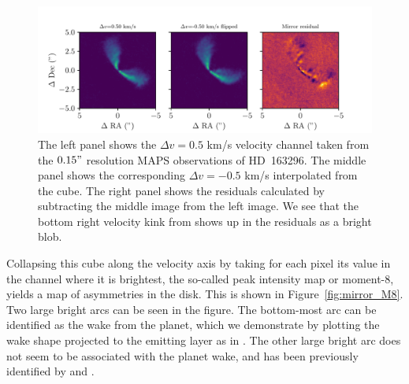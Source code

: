 \begin{figure}
    \centering
    \includegraphics[width = 0.999\textwidth]{figures/channel060jvm.pdf}
    \caption{The left panel shows the $\Delta v = 0.5$ km/s velocity channel taken from the $0.15"$ resolution MAPS observations of HD~163296. The middle panel shows the corresponding $\Delta v = -0.5$ km/s interpolated from the cube. The right panel shows the residuals calculated by subtracting the middle image from the left image. We see that the bottom right velocity kink from \citet{calcino2022} shows up in the residuals as a bright blob.}
    \label{fig:mirror_residuals}
\end{figure}

Collapsing this cube along the velocity axis by taking for each pixel its value in the channel where it is brightest, the so-called peak intensity map or moment-8, yields a map of asymmetries in the disk.
This is shown in Figure~\ref{fig:mirror_M8}.
Two large bright arcs can be seen in the figure.
The bottom-most arc can be identified as the wake from the planet, which we demonstrate by plotting the wake shape projected to the emitting layer as in \citet{calcino2022}.
The other large bright arc does not seem to be associated with the planet wake, and has been previously identified by \citet{teague2021} and \citet{calcino2022}.


